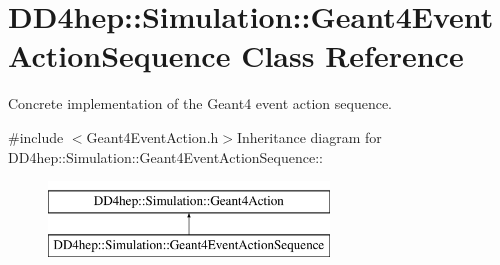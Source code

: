 \hypertarget{class_d_d4hep_1_1_simulation_1_1_geant4_event_action_sequence}{
\section{DD4hep::Simulation::Geant4EventActionSequence Class Reference}
\label{class_d_d4hep_1_1_simulation_1_1_geant4_event_action_sequence}
}


Concrete implementation of the Geant4 event action sequence.  


{\ttfamily \#include $<$Geant4EventAction.h$>$}Inheritance diagram for DD4hep::Simulation::Geant4EventActionSequence::\begin{figure}[H]
\begin{center}
\leavevmode
\includegraphics[height=2cm]{class_d_d4hep_1_1_simulation_1_1_geant4_event_action_sequence}
\end{center}
\end{figure}
